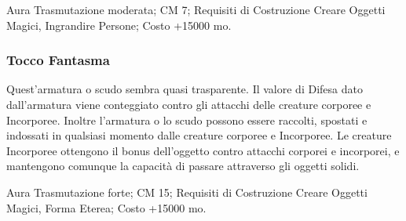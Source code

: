 \begin{multicols}{2}
Aura Trasmutazione moderata; CM 7; Requisiti di Costruzione Creare Oggetti Magici, Ingrandire Persone; Costo +15000 mo.

\subsubsection{Tocco Fantasma}

Quest'armatura o scudo sembra quasi trasparente. Il valore di Difesa dato dall'armatura viene conteggiato contro gli attacchi delle creature corporee e Incorporee. Inoltre l'armatura o lo scudo possono essere raccolti, spostati e indossati in qualsiasi momento dalle creature corporee e Incorporee. Le creature Incorporee ottengono il bonus dell'oggetto contro attacchi corporei e incorporei, e mantengono comunque la capacità di passare attraverso gli oggetti solidi.

Aura Trasmutazione forte; CM 15; Requisiti di Costruzione Creare Oggetti Magici, Forma Eterea; Costo +15000 mo.
\end{multicols}